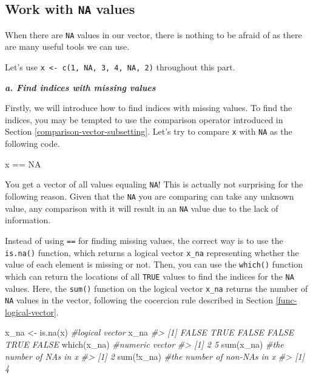 \documentclass[
]{book}
\newenvironment{Shaded}{\begin{snugshade}}{\end{snugshade}}
\newcommand{\CommentTok}[1]{\textcolor[rgb]{0.56,0.35,0.01}{\textit{#1}}}
\newcommand{\ConstantTok}[1]{\textcolor[rgb]{0.00,0.00,0.00}{#1}}
\newcommand{\FunctionTok}[1]{\textcolor[rgb]{0.00,0.00,0.00}{#1}}
\newcommand{\NormalTok}[1]{#1}
\newcommand{\OtherTok}[1]{\textcolor[rgb]{0.56,0.35,0.01}{#1}}
\newcommand{\SpecialCharTok}[1]{\textcolor[rgb]{0.00,0.00,0.00}{#1}}
\begin{document}
\hypertarget{work-with-na-values}{%
\subsection{\texorpdfstring{Work with \texttt{NA} values}{Work with NA values}}\label{work-with-na-values}}

When there are \texttt{NA} values in our vector, there is nothing to be afraid of as there are many useful tools we can use.

Let's use \texttt{x\ \textless{}-\ c(1,\ NA,\ 3,\ 4,\ NA,\ 2)} throughout this part.

\textbf{\emph{a. Find indices with missing values}}

Firstly, we will introduce how to find indices with missing values. To find the indices, you may be tempted to use the comparison operator introduced in Section \ref{comparison-vector-subsetting}. Let's try to compare \texttt{x} with \texttt{NA} as the following code.

\begin{Shaded}
\begin{Highlighting}[]
\NormalTok{x }\SpecialCharTok{==} \ConstantTok{NA}
\end{Highlighting}
\end{Shaded}

You get a vector of all values equaling \texttt{NA}! This is actually not surprising for the following reason. Given that the \texttt{NA} you are comparing can take any unknown value, any comparison with it will result in an \texttt{NA} value due to the lack of information.

Instead of using \texttt{==} for finding missing values, the correct way is to use the \texttt{is.na()} function, which returns a logical vector \texttt{x\_na} representing whether the value of each element is missing or not. Then, you can use the \texttt{which()} function which can return the locations of all \texttt{TRUE} values to find the indices for the \texttt{NA} values. Here, the \texttt{sum()} function on the logical vector \texttt{x\_na} returns the number of \texttt{NA} values in the vector, following the cocercion rule described in Section \ref{func-logical-vector}.

\begin{Shaded}
\begin{Highlighting}[]
\NormalTok{x\_na }\OtherTok{\textless{}{-}} \FunctionTok{is.na}\NormalTok{(x)        }\CommentTok{\#logical vector     }
\NormalTok{x\_na}
\CommentTok{\#\textgreater{} [1] FALSE  TRUE FALSE FALSE  TRUE FALSE}
\FunctionTok{which}\NormalTok{(x\_na)             }\CommentTok{\#numeric vector}
\CommentTok{\#\textgreater{} [1] 2 5}
\FunctionTok{sum}\NormalTok{(x\_na)               }\CommentTok{\#the number of NAs in x }
\CommentTok{\#\textgreater{} [1] 2}
\FunctionTok{sum}\NormalTok{(}\SpecialCharTok{!}\NormalTok{x\_na)              }\CommentTok{\#the number of non{-}NAs in x}
\CommentTok{\#\textgreater{} [1] 4}
\end{Highlighting}
\end{Shaded}
\end{document}
